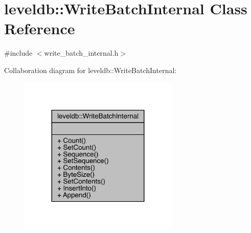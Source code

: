 \hypertarget{classleveldb_1_1_write_batch_internal}{}\section{leveldb\+::Write\+Batch\+Internal Class Reference}
\label{classleveldb_1_1_write_batch_internal}


{\ttfamily \#include $<$write\+\_\+batch\+\_\+internal.\+h$>$}



Collaboration diagram for leveldb\+::Write\+Batch\+Internal\+:
\nopagebreak
\begin{figure}[H]
\begin{center}
\leavevmode
\includegraphics[width=215pt]{classleveldb_1_1_write_batch_internal__coll__graph}
\end{center}
\end{figure}
